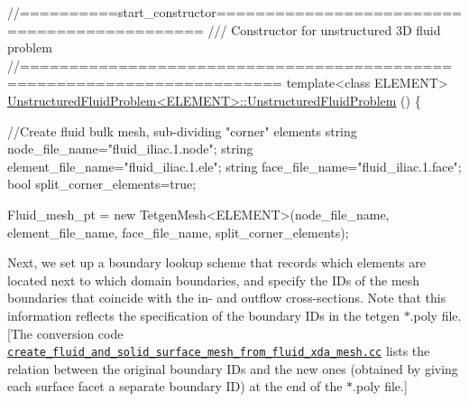 \begin{DoxyCodeInclude}
\textcolor{comment}{//==========start\_constructor=============================================}
\textcolor{comment}{/// Constructor for unstructured 3D fluid problem}
\textcolor{comment}{}\textcolor{comment}{//========================================================================}
\textcolor{keyword}{template}<\textcolor{keyword}{class} ELEMENT>
\hyperlink{classUnstructuredFluidProblem_a9751f4afac540e148b3d90ae43dd5187}{UnstructuredFluidProblem<ELEMENT>::UnstructuredFluidProblem}
      ()
\{ 
 
 \textcolor{comment}{//Create fluid bulk mesh, sub-dividing "corner" elements}
 \textcolor{keywordtype}{string} node\_file\_name=\textcolor{stringliteral}{"fluid\_iliac.1.node"};
 \textcolor{keywordtype}{string} element\_file\_name=\textcolor{stringliteral}{"fluid\_iliac.1.ele"};
 \textcolor{keywordtype}{string} face\_file\_name=\textcolor{stringliteral}{"fluid\_iliac.1.face"};
 \textcolor{keywordtype}{bool} split\_corner\_elements=\textcolor{keyword}{true};

 Fluid\_mesh\_pt =  \textcolor{keyword}{new} TetgenMesh<ELEMENT>(node\_file\_name,
                                            element\_file\_name,
                                            face\_file\_name,
                                          split\_corner\_elements);

\end{DoxyCodeInclude}


Next, we set up a boundary lookup scheme that records which elements are located next to which domain boundaries, and specify the I\+Ds of the mesh boundaries that coincide with the in-\/ and outflow cross-\/sections. Note that this information reflects the specification of the boundary I\+Ds in the {\ttfamily tetgen} {\ttfamily $\ast$.poly} file. \mbox{[}The conversion code \href{../../../../demo_drivers/meshing/mesh_from_vmtk/create_fluid_and_solid_surface_mesh_from_fluid_xda_mesh.cc}{\tt create\+\_\+fluid\+\_\+and\+\_\+solid\+\_\+surface\+\_\+mesh\+\_\+from\+\_\+fluid\+\_\+xda\+\_\+mesh.\+cc} lists the relation between the original boundary I\+Ds and the new ones (obtained by giving each surface facet a separate boundary ID) at the end of the {\ttfamily $\ast$.poly} file.\mbox{]}


